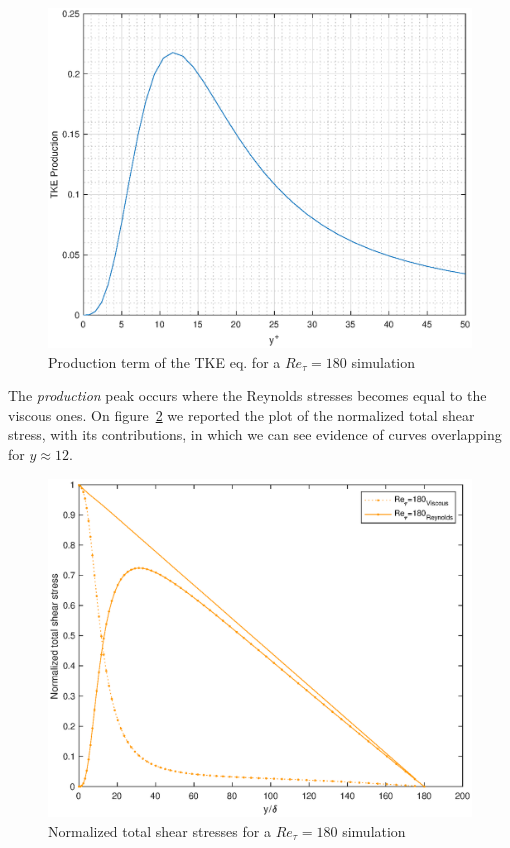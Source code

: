 \begin{figure}
\begin{center}
\includegraphics[scale=0.55]{grafici/tke_prod_180.eps}
\caption{Production term of the TKE eq. for a $Re_{\tau}=180$ simulation}
\label{tke:prod:180}
\end{center} 
\end{figure}

The \emph{production} peak occurs where the Reynolds stresses becomes equal to the viscous ones.
On figure~\ref{stresses:180} we reported the plot of the normalized total shear stress, with its contributions, in which we can see evidence of curves overlapping for $y\approx 12$.\par


\begin{figure}
\begin{center}
\includegraphics[scale=0.55]{grafici/stresses_180.eps}
\caption{Normalized total shear stresses for a $Re_{\tau}=180$ simulation}
\label{stresses:180}
\end{center} 
\end{figure}